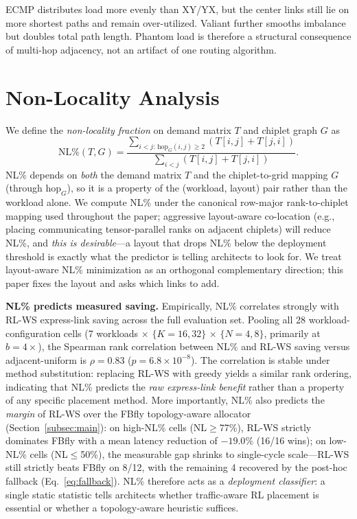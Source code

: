 \documentclass[conference]{IEEEtran}
\begin{document}
ECMP distributes load more evenly than XY/YX, but the center links still lie on more shortest paths and remain over-utilized. Valiant further smooths imbalance but doubles total path length. Phantom load is therefore a structural consequence of multi-hop adjacency, not an artifact of one routing algorithm.

\section{Non-Locality Analysis}
\label{sec:nl}

We define the \textit{non-locality fraction} on demand matrix $T$ and chiplet graph $G$ as
\begin{equation}
\mathrm{NL\%}(T,G) =
\frac{\sum_{i<j:\,\mathrm{hop}_G(i,j)\ge 2} \left(T[i,j] + T[j,i]\right)}
{\sum_{i<j} \left(T[i,j] + T[j,i]\right)}.
\end{equation}
NL\% depends on \textit{both} the demand matrix $T$ and the chiplet-to-grid mapping $G$ (through $\mathrm{hop}_G$), so it is a property of the (workload, layout) pair rather than the workload alone. We compute NL\% under the canonical row-major rank-to-chiplet mapping used throughout the paper; aggressive layout-aware co-location (e.g., placing communicating tensor-parallel ranks on adjacent chiplets) will reduce NL\%, and \textit{this is desirable}---a layout that drops NL\% below the deployment threshold is exactly what the predictor is telling architects to look for. We treat layout-aware NL\% minimization as an orthogonal complementary direction; this paper fixes the layout and asks which links to add.

\textbf{NL\% predicts measured saving.}
Empirically, NL\% correlates strongly with RL-WS express-link saving across the full evaluation set. Pooling all 28 workload-configuration cells (7 workloads $\times$ $\{K\!=\!16,32\}$ $\times$ $\{N\!=\!4,8\}$, primarily at $b{=}4\times$), the Spearman rank correlation between NL\% and RL-WS saving versus adjacent-uniform is $\rho=0.83$ ($p=6.8\times 10^{-8}$). The correlation is stable under method substitution: replacing RL-WS with greedy yields a similar rank ordering, indicating that NL\% predicts the \textit{raw express-link benefit} rather than a property of any specific placement method. More importantly, NL\% also predicts the \textit{margin} of RL-WS over the FBfly topology-aware allocator (Section~\ref{subsec:main}): on high-NL\% cells (NL$\ge$77\%), RL-WS strictly dominates FBfly with a mean latency reduction of $-19.0\%$ (16/16 wins); on low-NL\% cells (NL$\le$50\%), the measurable gap shrinks to single-cycle scale---RL-WS still strictly beats FBfly on 8/12, with the remaining 4 recovered by the post-hoc fallback (Eq.~\ref{eq:fallback}). NL\% therefore acts as a \textit{deployment classifier}: a single static statistic tells architects whether traffic-aware RL placement is essential or whether a topology-aware heuristic suffices.
\end{document}

